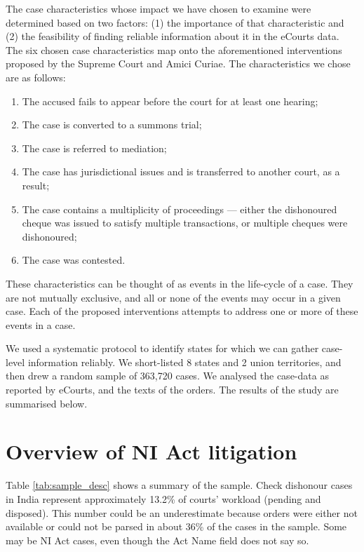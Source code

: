 \documentclass[11pt,a4paper]{article}
\begin{document}
The case characteristics whose impact we have chosen to examine were determined based on two factors: (1) the importance of that characteristic and (2) the feasibility of finding reliable information about it in the eCourts data. The six chosen case characteristics map onto the aforementioned interventions proposed by the Supreme Court and Amici Curiae. The characteristics we chose are as follows:
\begin{enumerate}
\item The accused fails to appear before the court for at least one hearing;
\item The case is converted to a summons trial;
\item The case is referred to mediation;
\item The case has jurisdictional issues and is transferred to another court, as a result;
\item The case contains a multiplicity of proceedings --- either the dishonoured cheque was issued to satisfy multiple transactions, or multiple cheques were dishonoured;
\item The case was contested.
\end{enumerate}

These characteristics can be thought of as events in the life-cycle of a case. They are not mutually exclusive, and all or none of the events may occur in a given case. Each of the proposed interventions attempts to address one or more of these events in a case.

We used a systematic protocol to identify states for which we can gather case-level information reliably. We short-listed 8 states and 2 union territories, and then drew a random sample of 363,720 cases. We analysed the case-data as reported by eCourts, and the texts of the orders. The results of the study are summarised below.

\section{Overview of NI Act litigation}
\label{sec:findings}

Table \ref{tab:sample_desc} shows a summary of the sample. Check dishonour cases in India represent approximately 13.2\% of courts' workload (pending and disposed). This number could be an underestimate because orders were either not available or could not be parsed in about 36\% of the cases in the sample. Some may be NI Act cases, even though the Act Name field does not say so.
\end{document}
